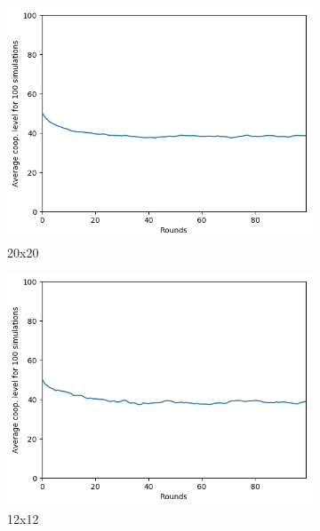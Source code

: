 \documentclass[letterpaper]{article}
\begin{document}
\begin{figure}
    \begin{subfigure}{.5\textwidth}
        \centering
        \includegraphics[width=1\linewidth]{images/assign2/20-part2}
        \caption{20x20}
        \label{fig:20moorepart2}
    \end{subfigure}
    \begin{subfigure}{.5\textwidth}
        \centering
        \includegraphics[width=1\linewidth]{images/assign2/12-part2}
        \caption{12x12}
        \label{fig:12moorepart2}
    \end{subfigure}
    \begin{subfigure}{.5\textwidth}

\end{subfigure}
\end{figure}
\end{document}
